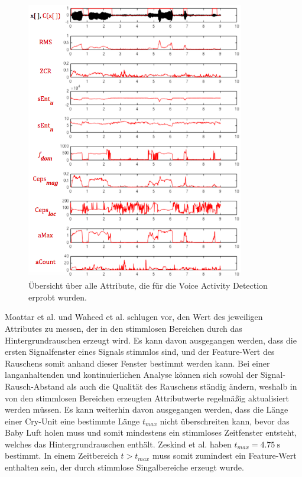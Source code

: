 \begin{figure}[H]
	\centering
	\includegraphics[width=0.85\textwidth]{bilder/allFeatures03.png}
	\caption[Übersicht über alle Attribute, die für die VAD erprobt wurden]{Übersicht über alle Attribute, die für die Voice Activity Detection erprobt wurden.}
	\label{img:vadAllFeatures}
\end{figure}

Moattar et al. \cite{vad_Easy} und Waheed et al. \cite{vad_entropy} schlugen vor, den Wert des jeweiligen Attributes zu messen, der in den stimmlosen Bereichen durch das Hintergrundrauschen erzeugt wird. Es kann davon ausgegangen werden, dass die ersten Signalfenster eines Signals stimmlos sind, und der Feature-Wert des Rauschens somit anhand dieser Fenster bestimmt werden kann. Bei einer langanhaltenden und kontinuierlichen Analyse können sich sowohl der Signal-Rausch-Abstand als auch die Qualität des Rauschens ständig ändern, weshalb in von den stimmlosen Bereichen erzeugten Attributwerte regelmäßig aktualisiert werden müssen. Es kann weiterhin davon ausgegangen werden, dass die Länge einer Cry-Unit eine bestimmte Länge $t_{max}$ nicht überschreiten kann, bevor das Baby Luft holen muss und somit mindestens ein stimmloses Zeitfenster entsteht, welches das Hintergrundrauschen enthält. Zeskind et al. \cite[S. 325]{rythmic} haben $t_{max} = \SI{4.75}{\second}$ bestimmt. In einem Zeitbereich $ t > t_{max}$ muss somit zumindest ein Feature-Wert enthalten sein, der durch stimmlose Singalbereiche erzeugt wurde. 

